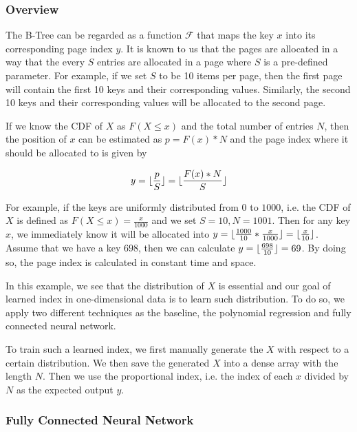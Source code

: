 \subsubsection{Overview}

The B-Tree can be regarded as a function $\mathcal{F}$ that maps the key $x$ into its corresponding page index $y$. It is known to us that the pages are allocated in a way that the every $S$ entries are allocated in a page where $S$ is a pre-defined parameter. For example, if we set $S$ to be 10 items per page, then the first page will contain the first 10 keys and their corresponding values. Similarly, the second 10 keys and their corresponding values will be allocated to the second page.

If we know the CDF of $X$ as $F(X\leq x)$ and the total number of entries $N$, then the position of $x$ can be estimated as $p=F(x)*N$ and the page index where it should be allocated to is given by

$$y=\lfloor\frac{p}{S}\rfloor=\lfloor\frac{F(x)*N}{S}\rfloor$$  

\begin{mscexample}

For example, if the keys are uniformly distributed from $0$ to $1000$, i.e. the CDF of $X$ is defined as $F(X\leq x)=\frac{x}{1000}$ and we set $S=10, N=1001$. Then for any key $x$, we immediately know it will be allocated into $y=\lfloor\frac{1000}{10}*\frac{x}{1000}\rfloor=\lfloor\frac{x}{10}\rfloor$. Assume that we have a key $698$, then we can calculate $y=\lfloor\frac{698}{10}\rfloor=69$. By doing so, the page index is calculated in constant time and space.

\end{mscexample}



In this example, we see that the distribution of $X$ is essential and our goal of learned index in one-dimensional data is to learn such distribution. To do so, we apply two different techniques as the baseline, the polynomial regression and fully connected neural network.

To train such a learned index, we first manually generate the $X$ with respect to a certain distribution. We then save the generated $X$ into a dense array with the length $N$. Then we use the proportional index, i.e. the index of each $x$ divided by $N$ as the expected output $y$.
 
\subsubsection{Fully Connected Neural Network}

